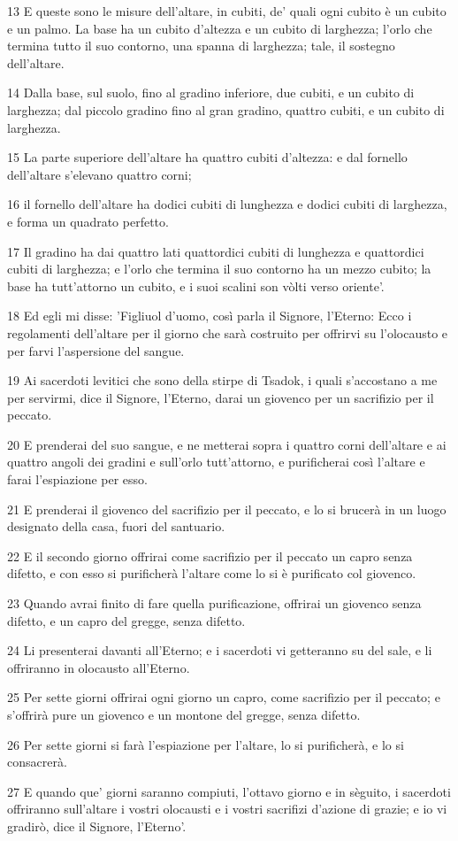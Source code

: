 \par 13 E queste sono le misure dell'altare, in cubiti, de' quali ogni cubito è un cubito e un palmo. La base ha un cubito d'altezza e un cubito di larghezza; l'orlo che termina tutto il suo contorno, una spanna di larghezza; tale, il sostegno dell'altare.
\par 14 Dalla base, sul suolo, fino al gradino inferiore, due cubiti, e un cubito di larghezza; dal piccolo gradino fino al gran gradino, quattro cubiti, e un cubito di larghezza.
\par 15 La parte superiore dell'altare ha quattro cubiti d'altezza: e dal fornello dell'altare s'elevano quattro corni;
\par 16 il fornello dell'altare ha dodici cubiti di lunghezza e dodici cubiti di larghezza, e forma un quadrato perfetto.
\par 17 Il gradino ha dai quattro lati quattordici cubiti di lunghezza e quattordici cubiti di larghezza; e l'orlo che termina il suo contorno ha un mezzo cubito; la base ha tutt'attorno un cubito, e i suoi scalini son vòlti verso oriente'.
\par 18 Ed egli mi disse: 'Figliuol d'uomo, così parla il Signore, l'Eterno: Ecco i regolamenti dell'altare per il giorno che sarà costruito per offrirvi su l'olocausto e per farvi l'aspersione del sangue.
\par 19 Ai sacerdoti levitici che sono della stirpe di Tsadok, i quali s'accostano a me per servirmi, dice il Signore, l'Eterno, darai un giovenco per un sacrifizio per il peccato.
\par 20 E prenderai del suo sangue, e ne metterai sopra i quattro corni dell'altare e ai quattro angoli dei gradini e sull'orlo tutt'attorno, e purificherai così l'altare e farai l'espiazione per esso.
\par 21 E prenderai il giovenco del sacrifizio per il peccato, e lo si brucerà in un luogo designato della casa, fuori del santuario.
\par 22 E il secondo giorno offrirai come sacrifizio per il peccato un capro senza difetto, e con esso si purificherà l'altare come lo si è purificato col giovenco.
\par 23 Quando avrai finito di fare quella purificazione, offrirai un giovenco senza difetto, e un capro del gregge, senza difetto.
\par 24 Li presenterai davanti all'Eterno; e i sacerdoti vi getteranno su del sale, e li offriranno in olocausto all'Eterno.
\par 25 Per sette giorni offrirai ogni giorno un capro, come sacrifizio per il peccato; e s'offrirà pure un giovenco e un montone del gregge, senza difetto.
\par 26 Per sette giorni si farà l'espiazione per l'altare, lo si purificherà, e lo si consacrerà.
\par 27 E quando que' giorni saranno compiuti, l'ottavo giorno e in sèguito, i sacerdoti offriranno sull'altare i vostri olocausti e i vostri sacrifizi d'azione di grazie; e io vi gradirò, dice il Signore, l'Eterno'.

